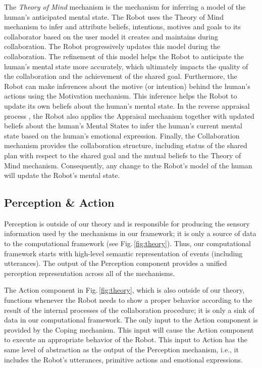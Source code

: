 The \textit{Theory of Mind} mechanism is the mechanism for inferring a model of
the human's anticipated mental state. The Robot uses the Theory of Mind
mechanism to infer and attribute beliefs, intentions, motives and goals to its
collaborator based on the user model it creates and maintains during
collaboration. The Robot progressively updates this model during the
collaboration. The refinement of this model helps the Robot to anticipate the
human's mental state more accurately, which ultimately impacts the quality of
the collaboration and the achievement of the shared goal. Furthermore, the Robot
can make inferences about the motive (or intention) behind the human's actions
using the Motivation mechanism. This inference helps the Robot to update its own
beliefs about the human's mental state. In the reverse appraisal process
\cite{gratch:reverse-appraisal}, the Robot also applies the Appraisal mechanism
together with updated beliefs about the human's Mental States to infer the
human's current mental state based on the human's emotional expression. Finally,
the Collaboration mechanism provides the collaboration structure, including
status of the shared plan with respect to the shared goal and the mutual beliefs
to the Theory of Mind mechanism. Consequently, any change to the Robot's model
of the human will update the Robot's mental state.

\subsection{Perception \& Action}
\label{sec:tom-mech}

Perception is outside of our theory and is responsible for producing the sensory
information used by the mechanisms in our framework; it is only a source of data
to the computational framework (see Fig.\,\ref{fig:theory}). Thus, our
computational framework starts with high-level semantic representation of events
(including utterances). The output of the Perception component provides a
unified perception representation across all of the mechanisms.

The Action component in Fig.\,\ref{fig:theory}, which is also outside of our
theory, functions whenever the Robot needs to show a proper behavior according
to the result of the internal processes of the collaboration procedure; it is
only a sink of data in our computational framework. The only input to the Action
component is provided by the Coping mechanism. This input will cause the Action
component to execute an appropriate behavior of the Robot. This input to Action
has the same level of abstraction as the output of the Perception mechanism,
i.e., it includes the Robot's utterances, primitive actions and emotional
expressions.

